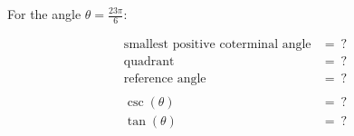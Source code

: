 For the angle $\theta = \frac{23\pi}{6}$:

$$
\begin{align*}
  \text{smallest positive coterminal angle} &=\ ? \\
  \text{quadrant} &=\ ? \\
  \text{reference angle} &=\ ? \\
  \\
  \csc(\theta) &=\ ? \\
  \tan(\theta) &=\ ?
\end{align*}
$$
